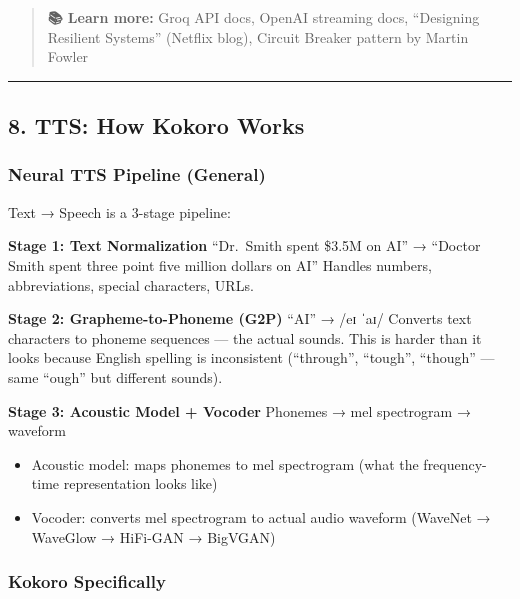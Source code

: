 \documentclass[
  11pt,
]{article}
\providecommand{\tightlist}{%
  \setlength{\itemsep}{0pt}\setlength{\parskip}{0pt}}
\begin{document}
\begin{quote}
\textbf{📚 Learn more:} Groq API docs, OpenAI streaming docs,
``Designing Resilient Systems'' (Netflix blog), Circuit Breaker pattern
by Martin Fowler
\end{quote}

\begin{center}\rule{0.5\linewidth}{0.5pt}\end{center}

\hypertarget{tts-how-kokoro-works}{%
\subsection{8. TTS: How Kokoro Works}\label{tts-how-kokoro-works}}

\hypertarget{neural-tts-pipeline-general}{%
\subsubsection{Neural TTS Pipeline
(General)}\label{neural-tts-pipeline-general}}

Text → Speech is a 3-stage pipeline:

\textbf{Stage 1: Text Normalization} ``Dr.~Smith spent \$3.5M on AI'' →
``Doctor Smith spent three point five million dollars on AI'' Handles
numbers, abbreviations, special characters, URLs.

\textbf{Stage 2: Grapheme-to-Phoneme (G2P)} ``AI'' → /eɪ ˈaɪ/ Converts
text characters to phoneme sequences --- the actual sounds. This is
harder than it looks because English spelling is inconsistent
(``through'', ``tough'', ``though'' --- same ``ough'' but different
sounds).

\textbf{Stage 3: Acoustic Model + Vocoder} Phonemes → mel spectrogram →
waveform

\begin{itemize}
\tightlist
\item
  Acoustic model: maps phonemes to mel spectrogram (what the
  frequency-time representation looks like)
\item
  Vocoder: converts mel spectrogram to actual audio waveform (WaveNet →
  WaveGlow → HiFi-GAN → BigVGAN)
\end{itemize}

\hypertarget{kokoro-specifically}{%
\subsubsection{Kokoro Specifically}\label{kokoro-specifically}}
\end{document}
